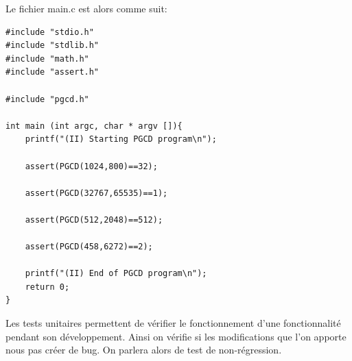 \documentclass[a4paper]{article}
\begin{document}
        Le fichier main.c est alors comme suit:
\begin{lstlisting}[style=CStyle]
#include "stdio.h"
#include "stdlib.h"
#include "math.h"
#include "assert.h"

#include "pgcd.h"

int main (int argc, char * argv []){
    printf("(II) Starting PGCD program\n");

    assert(PGCD(1024,800)==32);
    
    assert(PGCD(32767,65535)==1);
    
    assert(PGCD(512,2048)==512);
    
    assert(PGCD(458,6272)==2);

    printf("(II) End of PGCD program\n");
    return 0;
}
\end{lstlisting}

        Les tests unitaires permettent de vérifier le fonctionnement d'une fonctionnalité pendant son développement. 
        Ainsi on vérifie si les modifications que l'on apporte nous pas créer de bug.
        On parlera alors de test de non-régression.
\newpage
\end{document}
